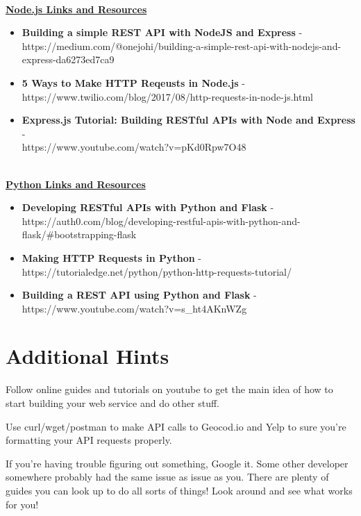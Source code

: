 \documentclass{article}
\begin{document}
\-\ \\
\textbf{\underline{Node.js Links and Resources}}
\begin{itemize} 
	\item \textbf{Building a simple REST API with NodeJS and Express} - \\ https://medium.com/@onejohi/building-a-simple-rest-api-with-nodejs-and-express-da6273ed7ca9
	\item \textbf{5 Ways to Make HTTP Reqeusts in Node.js} - \\ https://www.twilio.com/blog/2017/08/http-requests-in-node-js.html
	\item \textbf{Express.js Tutorial:  Building RESTful APIs with Node and Express} - \\https://www.youtube.com/watch?v=pKd0Rpw7O48
\end{itemize}

\-\ \\
\textbf{\underline{Python Links and Resources}}
\begin{itemize} 
	\item \textbf{Developing RESTful APIs with Python and Flask} - \\ https://auth0.com/blog/developing-restful-apis-with-python-and-flask/\#bootstrapping-flask
	\item \textbf{Making HTTP Requests in Python} - https://tutorialedge.net/python/python-http-requests-tutorial/
	\item \textbf{Building a REST API using Python and Flask} - https://www.youtube.com/watch?v=s\_ht4AKnWZg
\end{itemize}	




\section*{Additional Hints} %
\begin{info}
Follow online guides and tutorials on youtube to get the main idea of how to start building your web service and do other stuff.
\end{info}
\begin{info}
Use curl/wget/postman to make API calls to Geocod.io and Yelp to sure you're formatting your API requests properly. 
\end{info}
\begin{info}
If you're having trouble figuring out something, Google it. Some other developer somewhere probably had the same issue as issue as you. There are plenty of guides you can look up to do all sorts of things! Look around and see what works for you!
\end{info}
\end{document}

